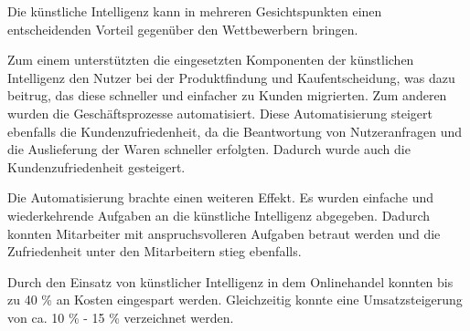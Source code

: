 Die künstliche Intelligenz kann in mehreren Gesichtspunkten einen entscheidenden Vorteil gegenüber den Wettbewerbern bringen.\vspace{0.2cm}

Zum einem unterstützten die eingesetzten Komponenten der künstlichen Intelligenz den Nutzer bei der Produktfindung und Kaufentscheidung, was dazu beitrug, das diese schneller und einfacher zu Kunden migrierten. Zum anderen wurden die Geschäftsprozesse automatisiert. Diese Automatisierung steigert ebenfalls die Kundenzufriedenheit, da die Beantwortung von Nutzeranfragen und die Auslieferung der Waren schneller erfolgten. Dadurch wurde auch die Kundenzufriedenheit gesteigert.\vspace{0.2cm}

Die Automatisierung brachte einen weiteren Effekt. Es wurden einfache und wiederkehrende Aufgaben an die künstliche Intelligenz abgegeben. Dadurch konnten Mitarbeiter mit anspruchsvolleren Aufgaben betraut werden und die Zufriedenheit unter den Mitarbeitern stieg ebenfalls.\vspace{0.2cm}

Durch den Einsatz von künstlicher Intelligenz in dem Onlinehandel konnten bis zu 40 \% an Kosten eingespart werden. Gleichzeitig konnte eine Umsatzsteigerung von ca. 10 \% - 15 \% verzeichnet werden.
